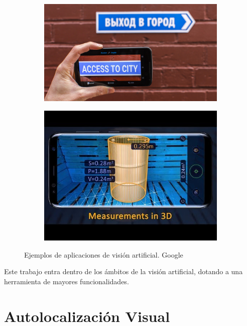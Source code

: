 \documentclass[a4paper, 12pt]{book}
\begin{document}
\begin{figure}[ht]
\centering
\begin{subfigure}{0.3\textwidth}
  \centering
  \includegraphics[scale=0.4]{img/google-translate-word-lens.jpg}
\end{subfigure}%
\qquad
\qquad
\qquad
\qquad
\qquad
\qquad
\begin{subfigure}{0.3\textwidth}
  \centering
  \includegraphics[scale=0.425]{img/measure-app.jpg}
\end{subfigure}%
\caption{Ejemplos de aplicaciones de visión artificial. Google}%
\end{figure}


Este trabajo entra dentro de los ámbitos de la visión artificial, dotando a una herramienta de mayores funcionalidades.

\section{Autolocalización Visual}
\label{sec:autolocalizacionvisual}
\end{document}

